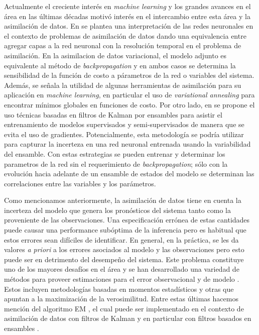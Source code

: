Actualmente el creciente interés en \textit{machine learning} y los grandes avances en el área en las últimas décadas motivó interés en el intercambio entre esta área y la asimilación de datos. En \cite{Abarbanel2018} se plantea una interpretación de las redes neuronales en el contexto de problemas de asimilación de datos dando una equivalencia entre agregar capas a la red neuronal con la resolución temporal en el problema de asimilación. En la asimilacion de datos variacional, el modelo adjunto es equivalente al método de \textit{backpropagation} y en ambos casos se determina la sensibilidad de la función de costo a párametros de la red o variables del sistema. Además, se señala la utilidad de algunas herramientas de asimilación para su aplicación en \textit{machine learning}, en particular el uso de \textit{variational annealing} para encontrar mínimos globales en funciones de costo. Por otro lado, en \cite{Kovachki2019} se propone el uso técnicas basadas en filtros de Kalman por ensambles para asistir el entrenamiento de modelos supervisados y semi-supervisados de manera que se evita el uso de gradientes. Potencialmente, esta metodología se podría utilizar para capturar la incerteza en una red neuronal entrenada usando la variabilidad del ensamble. Con estas estrategias se pueden entrenar y determinar los parametros de la red sin el requerimiento de \textit{backpropagation}; sólo con la evolución hacia adelante de un ensamble de estados del modelo se determinan las correlaciones entre las variables y los parámetros.

Como mencionamos anteriormente, la asimilación de datos tiene en cuenta la incerteza del modelo que genera los pronósticos del sistema tanto como la proveniente de las observaciones. Una especificación errónea de estas cantidades puede causar una performance subóptima de la inferencia pero es habitual que estos errores sean difíciles de identificar. En general, en la práctica, se les da valores \textit{a priori} a los errores asociados al modelo y las observaciones pero esto puede ser en detrimento del desempeño del sistema. Este problema constituye uno de los mayores desafíos en el área y se han desarrollado una variedad de métodos para proveer estimaciones para el error observacional y de modelo \citep{Tandeo2020}. Estos incluyen metodologías basadas en momentos estadísticos y otras que apuntan a la maximización de la verosimilitud. Entre estas últimas hacemos mención del algoritmo EM \citep{Dempster1977}, el cual puede ser implementado en el contexto de asimilación de datos con filtros de Kalman y en particular con filtros basados en ensambles \citep{Tandeo2015}.

